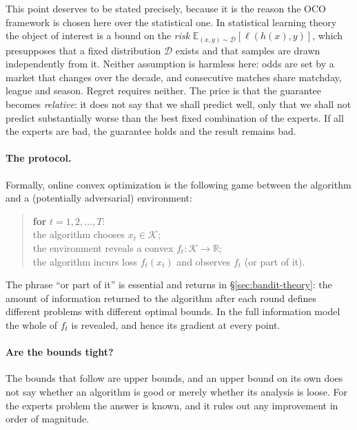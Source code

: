 \documentclass[12pt,a4paper,oneside]{report}
\renewcommand{\_}{\oldunderscore\allowbreak}
\theoremstyle{definition}
\theoremstyle{plain}
\theoremstyle{remark}
\begin{document}
This point deserves to be stated precisely, because it is the reason the OCO framework is
chosen here over the statistical one. In statistical learning theory the object of interest is
a bound on the \emph{risk} $\mathbb{E}_{(x,y)\sim\mathcal{D}}[\ell(h(x),y)]$, which presupposes
that a fixed distribution $\mathcal{D}$ exists and that samples are drawn independently from
it. Neither assumption is harmless here: odds are set by a market that changes over the
decade, and consecutive matches share matchday, league and season. Regret requires neither.
The price is that the guarantee becomes \emph{relative}: it does not say that we shall predict
well, only that we shall not predict substantially worse than the best fixed combination of
the experts. If all the experts are bad, the guarantee holds and the result remains bad.

\paragraph{The protocol.} Formally, online convex optimization is the following game between
the algorithm and a (potentially adversarial) environment:

\begin{quote}
\textbf{for} $t = 1,2,\dots,T$:\\[2pt]
\hspace*{1em} the algorithm chooses $x_t \in \mathcal{K}$;\\
\hspace*{1em} the environment reveals a convex $f_t : \mathcal{K}\to\mathbb{R}$;\\
\hspace*{1em} the algorithm incurs loss $f_t(x_t)$ and observes $f_t$ (or part of it).
\end{quote}

The phrase ``or part of it'' is essential and returns in \S\ref{sec:bandit-theory}: the amount
of information returned to the algorithm after each round defines different problems with
different optimal bounds. In the full information model the whole of $f_t$ is revealed, and
hence its gradient at every point.

\paragraph{Are the bounds tight?} The bounds that follow are upper bounds, and an upper bound
on its own does not say whether an algorithm is good or merely whether its analysis is loose.
For the experts problem the answer is known, and it rules out any improvement in order of
magnitude.
\end{document}

